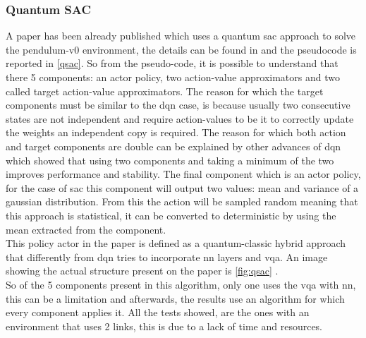 \subsubsection{Quantum SAC}
A paper has been already published which uses a quantum \acrshort{sac} approach to solve the pendulum-v0 environment, the details can be found in \cite{https://doi.org/10.48550/arxiv.2112.11921} and the pseudocode is reported in \ref{qsac}.
So from the pseudo-code, it is possible to understand that there 5 components: an actor policy, two action-value approximators and two called target action-value approximators.
The reason for which the target components must be similar to the \acrshort{dqn} case, is because usually two consecutive states are not independent and require action-values to be it to correctly update the weights an independent copy is required.
The reason for which both action and target components are double can be explained by other advances of \acrshort{dqn} which showed that using two components and taking a minimum of the two improves performance and stability.
The final component which is an actor policy, for the case of \acrshort{sac} this component will output two values: mean and variance of a gaussian distribution. From this the action will be sampled random meaning that this approach is statistical, it can be converted to deterministic by using the mean extracted from the component.\\
This policy actor in the paper is defined as a quantum-classic hybrid approach that differently from \acrshort{dqn} tries to incorporate \acrlong{nn} layers and \acrlong{vqa}. An image showing the actual structure present on the paper is \ref{fig:qsac} .\\
So of the 5 components present in this algorithm, only one uses the \acrshort{vqa} with \acrshort{nn}, this can be a limitation and afterwards, the results use an algorithm for which every component applies it. All the tests showed, are the ones with an environment that uses 2 links, this is due to a lack of time and resources. 
